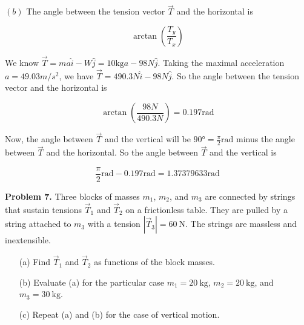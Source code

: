 \documentclass[12pt]{article}
\theoremstyle{definition}
\begin{document}
$(b)$ The angle between the tension vector $\vec{T}$ and the horizontal is 

\begin{equation*}
    \arctan\left( \frac{T_y}{T_x} \right) 
\end{equation*}

We know $\vec{T} = ma \hat{i} - W \hat{j} = 10\text{kg} a - 98N \hat{j}$. Taking
the maximal acceleration $a = 49.03 m / s^2$, we have $\vec{T} = 490.3N \hat{i}
- 98N \hat{j}$. So the angle between the tension vector and the horizontal is 

\begin{equation*}
    \arctan\left( \frac{98N}{490.3N} \right) = 0.197\text{rad}
\end{equation*}

Now, the angle between $\vec{T}$ and the vertical will be $\ang{90} =
\frac{\pi}{2}\text{rad}$ minus the angle between $\vec{T}$ and the horizontal.
So the angle between $\vec{T}$ and the vertical is 

\begin{equation}
    \frac{\pi}{2}\text{rad} - 0.197\text{rad}= 1.37379633\text{rad}
\end{equation}

\pagebreak 


\begin{shaded}
\textbf{Problem 7.} Three blocks of masses $m_1$, $m_2$, and $m_3$ are connected by strings that sustain tensions $\vec{T}_1$ and $\vec{T}_2$ on a frictionless table. They are pulled by a string attached to $m_3$ with a tension $|\vec{T}_3| = 60~\mathrm{N}$. The strings are massless and inextensible.

\begin{enumerate}
    \item[(a)] Find $\vec{T}_1$ and $\vec{T}_2$ as functions of the block masses.
    \item[(b)] Evaluate (a) for the particular case $m_1 = 20~\mathrm{kg}$, $m_2 = 20~\mathrm{kg}$, and $m_3 = 30~\mathrm{kg}$.
    \item[(c)] Repeat (a) and (b) for the case of vertical motion.
\end{enumerate}

\begin{center}
\end{center}


\end{shaded}
\end{document}
